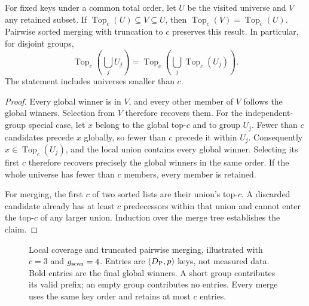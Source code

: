 \begin{resultblock}
\begin{proposition}
\label{prop:5-local-coverage}
For fixed keys under a common total order, let $U$ be the visited
universe and $V$ any retained subset. If
$\operatorname{Top}_c(U)\subseteq V\subseteq U$, then
$\operatorname{Top}_c(V)=\operatorname{Top}_c(U)$.
Pairwise sorted merging with truncation to $c$ preserves this result.
In particular, for disjoint groups,
\begin{equation}
 \operatorname{Top}_c\!\left(\bigcup_j U_j\right)
 =\operatorname{Top}_c\!\left(\bigcup_j
                    \operatorname{Top}_c(U_j)\right).
 \label{eq:5-topc-union}
\end{equation}
The statement includes universes smaller than $c$.
\end{proposition}
\begin{proof}
Every global winner is in $V$, and every other member of $V$ follows
the global winners. Selection from $V$ therefore recovers them.
For the independent-group special case, let $x$ belong to the global
top-$c$ and to group $U_j$. Fewer than $c$
candidates precede $x$ globally, so fewer than $c$ precede it within $U_j$.
Consequently $x\in\operatorname{Top}_c(U_j)$, and the local union contains
every global winner. Selecting its first $c$ therefore recovers precisely
the global winners in the same order. If the whole universe has fewer
than $c$ members, every member is retained.

For merging, the first $c$ of two sorted lists are their union's
top-$c$. A discarded candidate already has at least $c$ predecessors
within that union and cannot enter the top-$c$ of any larger union.
Induction over the merge tree establishes the claim.
\end{proof}
\end{resultblock}

\begin{figure}[tbp]
\centering

\caption[Local coverage and truncated pairwise merging]{Local coverage and truncated pairwise merging, illustrated with
$c=3$ and $g_{\mathrm{scan}}=4$. Entries are $(D_{\mathrm{P}},p)$ keys, not measured data.
Bold entries are the final global winners. A short group contributes its
valid prefix; an empty group contributes no entries. Every merge uses the
same key order and retains at most $c$ entries.}
\label{fig:5-global-selection}
\end{figure}

